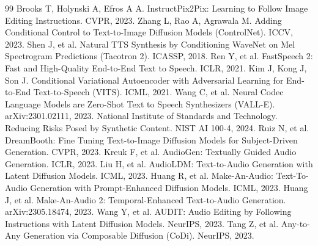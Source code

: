 \documentclass[UTF8,a4paper,zihao=-4,oneside,openany]{ctexbook}
\begin{document}
\begin{thebibliography}{99}
   Brooks T, Holynski A, Efros A A. InstructPix2Pix: Learning to Follow Image Editing Instructions. CVPR, 2023.
   Zhang L, Rao A, Agrawala M. Adding Conditional Control to Text-to-Image Diffusion Models (ControlNet). ICCV, 2023.
   Shen J, et al. Natural TTS Synthesis by Conditioning WaveNet on Mel Spectrogram Predictions (Tacotron 2). ICASSP, 2018.
   Ren Y, et al. FastSpeech 2: Fast and High-Quality End-to-End Text to Speech. ICLR, 2021.
   Kim J, Kong J, Son J. Conditional Variational Autoencoder with Adversarial Learning for End-to-End Text-to-Speech (VITS). ICML, 2021.
   Wang C, et al. Neural Codec Language Models are Zero-Shot Text to Speech Synthesizers (VALL-E). arXiv:2301.02111, 2023.
   National Institute of Standards and Technology. Reducing Risks Posed by Synthetic Content. NIST AI 100-4, 2024.
   Ruiz N, et al. DreamBooth: Fine Tuning Text-to-Image Diffusion Models for Subject-Driven Generation. CVPR, 2023.
   Kreuk F, et al. AudioGen: Textually Guided Audio Generation. ICLR, 2023.
   Liu H, et al. AudioLDM: Text-to-Audio Generation with Latent Diffusion Models. ICML, 2023.
   Huang R, et al. Make-An-Audio: Text-To-Audio Generation with Prompt-Enhanced Diffusion Models. ICML, 2023.
   Huang J, et al. Make-An-Audio 2: Temporal-Enhanced Text-to-Audio Generation. arXiv:2305.18474, 2023.
   Wang Y, et al. AUDIT: Audio Editing by Following Instructions with Latent Diffusion Models. NeurIPS, 2023.
   Tang Z, et al. Any-to-Any Generation via Composable Diffusion (CoDi). NeurIPS, 2023.
  
\end{thebibliography}
\end{document}
